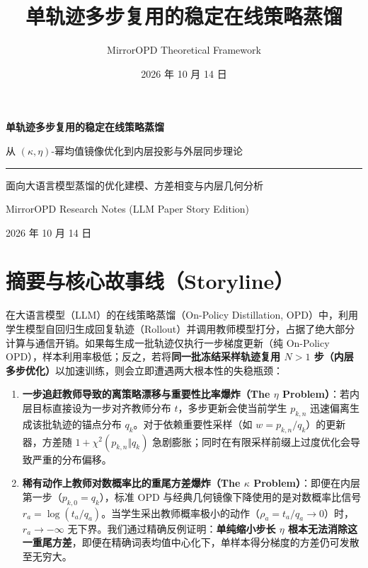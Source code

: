 \documentclass[lang=cn,scheme=chinese,openany]{../book/elegantbook}
\title{单轨迹多步复用的稳定在线策略蒸馏}
\author{MirrorOPD Theoretical Framework}
\date{2026 年 10 月 14 日}
\begin{document}
\hypersetup{pageanchor=false}
\begin{titlepage}
\centering
\vspace*{32mm}
{\Huge\bfseries 单轨迹多步复用的稳定在线策略蒸馏\par}
\vspace{10mm}
{\Large 从 $(\kappa,\eta)$-幂均值镜像优化到内层投影与外层同步理论\par}
\vspace{15mm}
{\color{structurecolor}\rule{0.8\textwidth}{1pt}\par}
\vspace{12mm}
{\large 面向大语言模型蒸馏的优化建模、方差相变与内层几何分析\par}
\vfill
{\large MirrorOPD Research Notes (LLM Paper Story Edition)\par}
\vspace{5mm}
{\large 2026 年 10 月 14 日\par}
\vspace{20mm}
\end{titlepage}
\frontmatter
\hypersetup{pageanchor=true}

\chapter*{摘要与核心故事线（Storyline）}

在大语言模型（LLM）的在线策略蒸馏（On-Policy Distillation, OPD）中，利用学生模型自回归生成回复轨迹（Rollout）并调用教师模型打分，占据了绝大部分计算与通信开销。如果每生成一批轨迹仅执行一步梯度更新（纯 On-Policy OPD），样本利用率极低；反之，若将\textbf{同一批冻结采样轨迹复用 $N>1$ 步（内层多步优化）}以加速训练，则会立即遭遇两大根本性的失稳瓶颈：
\begin{enumerate}
\item \textbf{一步追赶教师导致的离策略漂移与重要性比率爆炸（The $\eta$ Problem）}：若内层目标直接设为一步对齐教师分布 $t$，多步更新会使当前学生 $p_{k,n}$ 迅速偏离生成该批轨迹的锚点分布 $q_k$。对于依赖重要性采样（如 $w=p_{k,n}/q_k$）的更新器，方差随 $1+\chi^2(p_{k,n}\Vert q_k)$ 急剧膨胀；同时在有限采样前缀上过度优化会导致严重的分布偏移。
\item \textbf{稀有动作上教师对数概率比的重尾方差爆炸（The $\kappa$ Problem）}：即便在内层第一步（$p_{k,0}=q_k$），标准 OPD 与经典几何镜像下降使用的是对数概率比信号 $r_a=\log(t_a/q_a)$。当学生采出教师概率极小的动作（$\rho_a=t_a/q_a\to 0$）时，$r_a\to-\infty$ 无下界。我们通过精确反例证明：\textbf{单纯缩小步长 $\eta$ 根本无法消除这一重尾方差}，即便在精确词表均值中心化下，单样本得分梯度的方差仍可发散至无穷大。
\end{enumerate}
\end{document}
